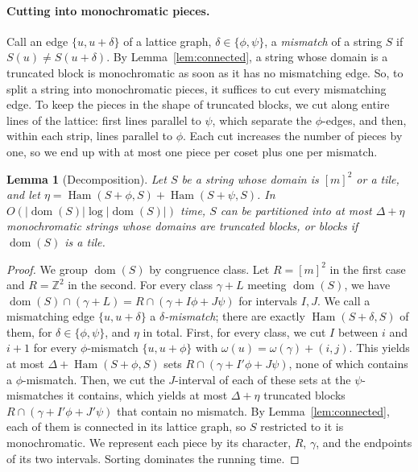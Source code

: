 \documentclass[11pt]{article}
\newtheorem{lemma}[theorem]{Lemma}
\theoremstyle{definition}
\newcommand{\Z}{\mathbb{Z}}
\renewcommand{\O}{O}
\DeclareMathOperator{\Ham}{Ham}
\DeclareMathOperator{\dom}{dom}
\newcommand{\abs}[1]{\lvert #1 \rvert}
\begin{document}
\paragraph{Cutting into monochromatic pieces.}
Call an edge $\{u, u+\delta\}$ of a lattice graph, $\delta \in \{\phi,\psi\}$, a \emph{mismatch} of a string $S$ if $S(u) \ne S(u+\delta)$.
By Lemma~\ref{lem:connected}, a string whose domain is a truncated block is monochromatic as soon as it has no mismatching edge.
So, to split a string into monochromatic pieces, it suffices to cut every mismatching edge.
To keep the pieces in the shape of truncated blocks, we cut along entire lines of the lattice: first lines parallel to $\psi$, which separate the $\phi$-edges, and then, within each strip, lines parallel to $\phi$.
Each cut increases the number of pieces by one, so we end up with at most one piece per coset plus one per mismatch.

\begin{lemma}[Decomposition]\label{lem:decomposition}
Let $S$ be a string whose domain is $[m]^2$ or a tile, and let $\eta = \Ham(S + \phi, S) + \Ham(S+\psi, S)$.
In $\O(\abs{\dom(S)}\log \abs{\dom(S)})$ time, $S$ can be partitioned into at most $\Delta + \eta$ monochromatic strings whose domains are truncated blocks, or blocks if $\dom(S)$ is a tile.
\end{lemma}
\begin{proof}
We group $\dom(S)$ by congruence class.
Let $R = [m]^2$ in the first case and $R = \Z^2$ in the second.
For every class $\gamma + L$ meeting $\dom(S)$, we have $\dom(S) \cap (\gamma + L) = R \cap (\gamma + I\phi + J\psi)$ for intervals $I, J$.
We call a mismatching edge $\{u, u+\delta\}$ a \emph{$\delta$-mismatch}; there are exactly $\Ham(S+\delta, S)$ of them, for $\delta \in \{\phi,\psi\}$, and $\eta$ in total.
First, for every class, we cut $I$ between $i$ and $i+1$ for every $\phi$-mismatch $\{u, u+\phi\}$ with $\omega(u) = \omega(\gamma) + (i,j)$.
This yields at most $\Delta + \Ham(S+\phi,S)$ sets $R \cap (\gamma + I'\phi + J\psi)$, none of which contains a $\phi$-mismatch.
Then, we cut the $J$-interval of each of these sets at the $\psi$-mismatches it contains, which yields at most $\Delta + \eta$ truncated blocks $R \cap (\gamma + I'\phi + J'\psi)$ that contain no mismatch.
By Lemma~\ref{lem:connected}, each of them is connected in its lattice graph, so $S$ restricted to it is monochromatic.
We represent each piece by its character, $R$, $\gamma$, and the endpoints of its two intervals.
Sorting dominates the running time.
\end{proof}
\end{document}
